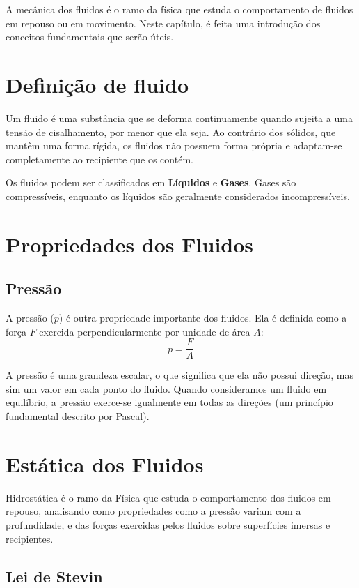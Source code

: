 A mecânica dos fluidos é o ramo da física que estuda o comportamento de fluidos em repouso ou em movimento. Neste capítulo, é feita uma introdução dos conceitos fundamentais que serão úteis.

\section{Definição de fluido}

Um fluido é uma substância que se deforma continuamente quando sujeita a uma tensão de cisalhamento, por menor que ela seja. Ao contrário dos sólidos, que mantêm uma forma rígida, os fluidos não possuem forma própria e adaptam-se completamente ao recipiente que os contém.

Os fluidos podem ser classificados em \textbf{Líquidos} e \textbf{Gases}. Gases são compressíveis, enquanto os líquidos são geralmente considerados incompressíveis.

\section{Propriedades dos Fluidos}

\subsection{Pressão}

A pressão (\( p \)) é outra propriedade importante dos fluidos. Ela é definida como a força \( F \) exercida perpendicularmente por unidade de área \( A \):
\begin{equation*}
    p = \frac{F}{A}
\end{equation*}

A pressão é uma grandeza escalar, o que significa que ela não possui direção, mas sim um valor em cada ponto do fluido. Quando consideramos um fluido em equilíbrio, a pressão exerce-se igualmente em todas as direções (um princípio fundamental descrito por Pascal).

\section{Estática dos Fluidos}

Hidrostática é o ramo da Física que estuda o comportamento dos fluidos em repouso, analisando como propriedades como a pressão variam com a profundidade, e das forças exercidas pelos fluidos sobre superfícies imersas e recipientes.

\subsection{Lei de Stevin}

